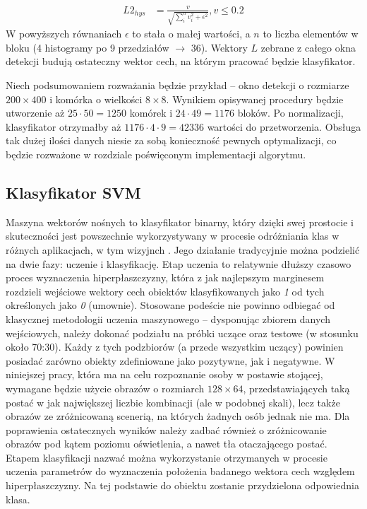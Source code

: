 \begin{equation}
\label{eq:HOG_norm4}
\left.\begin{aligned} 
L2_{hys}&=\frac{v}{\sqrt{\sum_{i}^{n}v_i^2+\epsilon^2}}, v\leq 0.2
\end{aligned}\right.
\end{equation}
W powyższych równaniach $\epsilon$ to stała o małej wartości, a $n$ to liczba elementów w bloku (4 histogramy po 9 przedziałów $\rightarrow$ 36). Wektory $L$ zebrane z całego okna detekcji budują ostateczny wektor cech, na którym pracować będzie klasyfikator.

Niech podsumowaniem rozważania będzie przykład -- okno detekcji o rozmiarze $200\times 400$ i komórka o wielkości $8 \times 8$. 
Wynikiem opisywanej procedury będzie utworzenie aż $25\cdot50=1250$ komórek i $24\cdot 49=1176$ bloków. 
Po normalizacji, klasyfikator otrzymałby aż $1176\cdot4\cdot9=42336$ wartości do przetworzenia. 
Obsługa tak dużej ilości danych niesie za sobą konieczność pewnych optymalizacji, co będzie rozważone w rozdziale poświęconym implementacji algorytmu.

\subsection{Klasyfikator SVM}

Maszyna wektorów nośnych to klasyfikator binarny, który dzięki swej prostocie i skuteczności jest powszechnie wykorzystywany w procesie odróżniania klas w różnych aplikacjach, w tym wizyjnch \cite{Gunn}. %
Jego działanie tradycyjnie można podzielić na dwie fazy: uczenie i klasyfikację. 
Etap uczenia to relatywnie dłuższy czasowo proces wyznaczenia hiperpłaszczyzny, która z jak najlepszym marginesem rozdzieli wejściowe wektory cech obiektów klasyfikowanych jako \textit{1} od tych określonych jako \textit{0} (umownie). 
Stosowane podeście nie powinno odbiegać od klasycznej metodologii uczenia maszynowego -- dysponując zbiorem danych wejściowych, należy dokonać podziału na próbki uczące oraz testowe (w stosunku około 70:30). %
Każdy z tych podzbiorów (a przede wszystkim uczący) powinien posiadać zarówno obiekty zdefiniowane jako pozytywne, jak i negatywne. 
W niniejszej pracy, która ma na celu rozpoznanie osoby w postawie stojącej, wymagane będzie użycie obrazów o rozmiarch $128\times64$, przedstawiających taką postać w jak największej liczbie kombinacji (ale w podobnej skali), lecz także obrazów ze zróżnicowaną scenerią, na których żadnych osób jednak nie ma. 
Dla poprawienia ostatecznych wyników należy zadbać również o zróżnicowanie obrazów pod kątem poziomu oświetlenia, a nawet tła otaczającego postać.
Etapem klasyfikacji nazwać można wykorzystanie otrzymanych w procesie uczenia parametrów do wyznaczenia położenia badanego wektora cech względem hiperpłaszczyzny. 
Na tej podstawie do obiektu zostanie przydzielona odpowiednia klasa.

